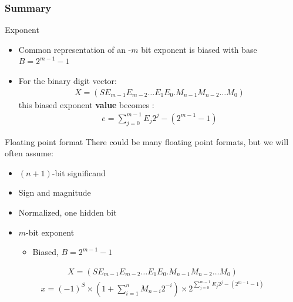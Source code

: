 \subsubsection{Summary}
\begin{parag}{Exponent}
    \begin{itemize}
        \item Common representation of an -$m$ bit exponent is biased with base $B = 2^{m-1}-1$
        \item For the binary digit vector:
            \begin{align*}
                X = (SE_{m-1}E_{m-2} \dots E_1E_0 . M_{n-1}M_{n-2} \dots M_0)
            \end{align*}
            this biased exponent \textbf{value} becomes : 
            \begin{align*}
                e = \sum_{j=0}^{m-1} E_j 2^j - (2^{m-1} - 1)
            \end{align*}
            
    \end{itemize}

\end{parag}
\begin{parag}{Floating point format}
    There could be many floating point formats, but we will often assume:
   \begin{itemize}
       \item $(n+1)$-bit significand 
       \item Sign and magnitude
       \item Normalized, one hidden bit
   \end{itemize}
   \begin{itemize}
       \item $m$-bit exponent
           \begin{itemize}
               \item Biased, $B = 2^{m-1} -1$
           \end{itemize}
   \end{itemize}
   \begin{align*}
       X = (SE_{m-1}E_{m-2} \dots E_1 E_0 . M_{n-1} M_{n-2} \dots M_0)
   \end{align*}
   \begin{align*}
       x = (-1)^S \times (1 + \sum_{i=1}^n M_{n-i}2^{-i}) \times 2^{\sum_{j=0}^{m-1} E_j 2^j - (2^{m-1}-1)}
   \end{align*}
   
   

\end{parag}

